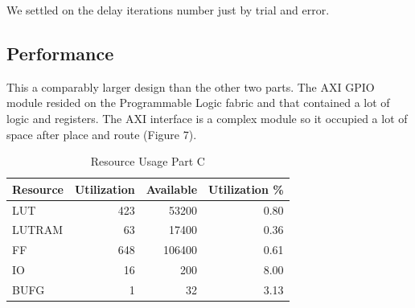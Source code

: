 \documentclass[letterpaper, 10 pt, conference]{IEEEconf}  %
\begin{document}
We settled on the delay iterations number just by trial and error.

\subsection{Performance}
This a comparably larger design than the other two parts. The AXI GPIO module resided on the Programmable Logic fabric and that contained a lot of logic and registers. The AXI interface is a complex module so it occupied a lot of space after place and route (Figure 7).

\begin{table}[H]
\centering
\caption{Resource Usage Part C}
\label{table_example}
\begin{tabular}{|l|r|r|r|}
\hline
\rowcolor[HTML]{EFEFEF} 
Resource & \multicolumn{1}{l|}{\cellcolor[HTML]{EFEFEF}Utilization} & \multicolumn{1}{l|}{\cellcolor[HTML]{EFEFEF}Available} & \multicolumn{1}{l|}{\cellcolor[HTML]{EFEFEF}Utilization \%} \\ \hline
LUT      & 423                                                        & 53200                                                  & 0.80                                                        \\ \hline
LUTRAM   & 63                                                        & 17400 & 0.36                                                        \\ \hline

FF       & 648                                                       & 106400                                                 & 0.61                                                        \\ \hline
IO       & 16                                                       & 200                                                    & 8.00                                                        \\ \hline
BUFG     & 1                                                        & 32                                                     & 3.13                                                        \\ \hline
\end{tabular}
\end{table}
\end{document}
